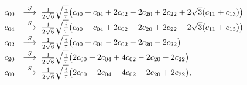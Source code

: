 \begin{equation}
  \begin{array}{rl}
    c_{00} &\stackrel{S}{\longrightarrow} ~{1\over
    2\sqrt{6}}\sqrt{i\over\tau}\big( c_{00} +c_{04} +2 c_{02} +
    2c_{20} +2c_{22} + 2\sqrt{3}(c_{11} +c_{13}) \big) \\
    c_{04} &\stackrel{S}{\longrightarrow} ~{1\over
    2\sqrt{6}}\sqrt{i\over\tau}\big( c_{00} +c_{04} +2 c_{02} +
    2c_{20} +2c_{22} - 2\sqrt{3}(c_{11} +c_{13}) \big) \\
    c_{02} &\stackrel{S}{\longrightarrow} ~{1\over
    2\sqrt{6}}\sqrt{i\over\tau}\big( c_{00} +c_{04} -2 c_{02} +
    2c_{20} -2c_{22} \big) \\
    c_{20} &\stackrel{S}{\longrightarrow} ~{1\over
    2\sqrt{6}}\sqrt{i\over\tau}\big( 2c_{00} +2c_{04} +4c_{02} -
    2c_{20} -2c_{22} \big) \\
    c_{00} &\stackrel{S}{\longrightarrow} ~{1\over
    2\sqrt{6}}\sqrt{i\over\tau}\big( 2c_{00} +2c_{04} -4c_{02} -
    2c_{20} +2c_{22} \big),
  \end{array}
\end{equation}


